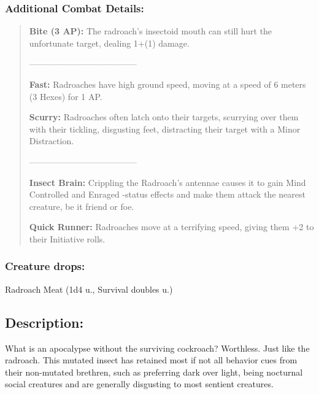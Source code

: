 \documentclass[11pt,a4paper,twocolumn]{book}
\begin{document}
	\subsubsection*{Additional Combat Details:}
	\begin{verse}

		\textbf{Bite (3 AP):} The radroach's insectoid mouth can still hurt the unfortunate target, dealing 1+(1) damage.
		
--------------------------------------		
		
		\textbf{Fast:} Radroaches have high ground speed, moving at a speed of 6 meters (3 Hexes) for 1 AP.

		\textbf{Scurry:} Radroaches often latch onto their targets, scurrying over them with their tickling, disgusting feet, distracting their target with a Minor Distraction.
		
--------------------------------------
		
		\textbf{Insect Brain:} Crippling the Radroach's antennae causes it to gain Mind Controlled and Enraged -status effects and make them attack the nearest creature, be it friend or foe.
		
		\textbf{Quick Runner:} Radroaches move at a terrifying speed, giving them +2 to their Initiative rolls.

		
%		
	\end{verse}
	
	\subsubsection*{Creature drops:}
	Radroach Meat (1d4 u., Survival doubles u.)
	
	
	
	\subsection*{Description:}
	What is an apocalypse without the surviving cockroach? Worthless. Just like the radroach. This mutated insect has retained most if not all behavior cues from their non-mutated brethren, such as preferring dark over light, being nocturnal social creatures and are generally disgusting to most sentient creatures.
	
\end{document}
